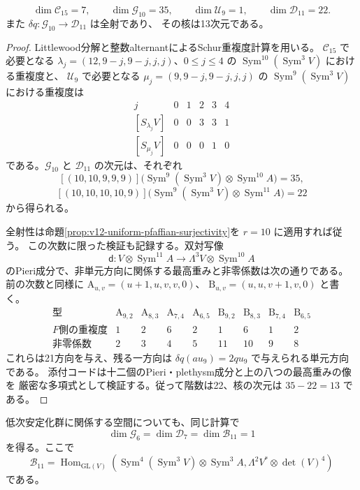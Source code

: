 \begin{proposition}[15次の次元とPfaffian微分]
\label{prop:v12-fifteenth-characters}
\[
 \dim\mathcal C_{15}=7,\qquad
 \dim\mathcal G_{10}=35,\qquad
 \dim\mathcal U_9=1,\qquad
 \dim\mathcal D_{11}=22.
\]
また $\delta q:\mathcal G_{10}\to\mathcal D_{11}$ は全射であり、
その核は13次元である。
\end{proposition}
\begin{proof}
Littlewood分解と整数alternantによるSchur重複度計算を用いる。
$\mathcal C_{15}$ で必要となる
$\lambda_j=(12,9-j,9-j,j,j)$、$0\le j\le4$ の
$\operatorname{Sym}^{10}(\operatorname{Sym}^3V)$ における重複度と、
$\mathcal U_9$ で必要となる
$\mu_j=(9,9-j,9-j,j,j)$ の
$\operatorname{Sym}^{9}(\operatorname{Sym}^3V)$ における重複度は
\[
\begin{array}{c|rrrrr}
 j&0&1&2&3&4\\\hline
 {}[S_{\lambda_j}V]&0&0&3&3&1\\
 {}[S_{\mu_j}V]&0&0&0&1&0
\end{array}
\]
である。$\mathcal G_{10}$ と $\mathcal D_{11}$ の次元は、それぞれ
\[
 [(10,10,9,9,9)]
 \bigl(\operatorname{Sym}^{9}(\operatorname{Sym}^3V)
                  \otimes\operatorname{Sym}^{10}A\bigr)=35,
\]
\[
 [(10,10,10,10,9)]
 \bigl(\operatorname{Sym}^{9}(\operatorname{Sym}^3V)
                  \otimes\operatorname{Sym}^{11}A\bigr)=22
\]
から得られる。

全射性は命題\ref{prop:v12-uniform-pfaffian-surjectivity}を $r=10$ に適用すれば従う。
この次数に限った検証も記録する。双対写像
\[
 \mathsf d:V\otimes\operatorname{Sym}^{11}A
       \longrightarrow\Lambda^3V\otimes\operatorname{Sym}^{10}A
\]
のPieri成分で、非単元方向に関係する最高重みと非零係数は次の通りである。
前の次数と同様に
$\mathrm A_{u,v}=(u+1,u,v,v,0)$、
$\mathrm B_{u,v}=(u,u,v+1,v,0)$ と書く。
\[
\begin{array}{c|rrrr|rrrr}
 \text{型}&\mathrm A_{9,2}&\mathrm A_{8,3}&\mathrm A_{7,4}&\mathrm A_{6,5}
 &\mathrm B_{9,2}&\mathrm B_{8,3}&\mathrm B_{7,4}&\mathrm B_{6,5}\\\hline
 \text{$F$側の重複度}&1&2&6&2&1&6&1&2\\
 \text{非零係数}&2&3&4&5&11&10&9&8
\end{array}
\]
これらは21方向を与え、残る一方向は
$\delta q(au_9)=2qu_9$ で与えられる単元方向である。
添付コードは十二個のPieri・plethysm成分と上の八つの最高重みの像を
厳密な多項式として検証する。従って階数は22、核の次元は $35-22=13$ である。
\end{proof}

低次安定化群に関係する空間についても、同じ計算で
\[
 \dim\mathcal G_6=\dim\mathcal D_7=\dim\mathcal B_{11}=1
\]
を得る。ここで
\[
 \mathcal B_{11}
 =\operatorname{Hom}_{\mathrm{GL}(V)}
 \left(\operatorname{Sym}^{4}(\operatorname{Sym}^3V)
       \otimes\operatorname{Sym}^{3}A,
       \Lambda^2V^*\otimes\det(V)^4\right)
\]
である。


